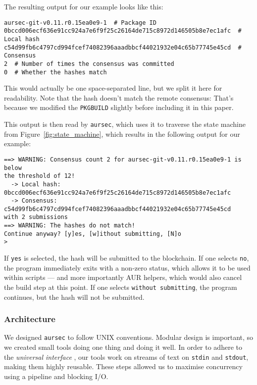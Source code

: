 The resulting output for our example looks like this:

\begin{verbatim}
aursec-git-v0.11.r0.15ea0e9-1  # Package ID
0bccd006ecf636e91cc924a7e6f9f25c26164de715c8972d146505b8e7ec1afc  # Local hash
c54d99fb6c4797cd994fcef74082396aaadbbcf44021932e04c65b77745e45cd  # Consensus
2  # Number of times the consensus was committed
0  # Whether the hashes match
\end{verbatim}

This would actually be one space-separated line, but we split it here for readability. Note that the hash doesn't match the remote consensus: That's because we modified the \texttt{PKGBUILD} slightly before including it in this paper.

This output is then read by \texttt{aursec}, which uses it to traverse the state machine from Figure~\ref{fig:state_machine}, which results in the following output for our example:

\begin{verbatim}
==> WARNING: Consensus count 2 for aursec-git-v0.11.r0.15ea0e9-1 is below
the threshold of 12!
  -> Local hash: 0bccd006ecf636e91cc924a7e6f9f25c26164de715c8972d146505b8e7ec1afc
  -> Consensus:  c54d99fb6c4797cd994fcef74082396aaadbbcf44021932e04c65b77745e45cd
with 2 submissions
==> WARNING: The hashes do not match!
Continue anyway? [y]es, [w]ithout submitting, [N]o
>
\end{verbatim}

If \texttt{yes} is selected, the hash will be submitted to the blockchain. If one selects \texttt{no}, the program immediately exits with a non-zero status, which allows it to be used within scripts --- and more importantly AUR helpers, which would also cancel the build step at this point.
If one selects \texttt{without submitting}, the program continues, but the hash will not be submitted.

\subsubsection{Architecture} \label{sec:aur-architecture}

We designed \texttt{aursec} to follow UNIX conventions.
Modular design is important, so we created small tools doing one thing and doing it well. In order to adhere to the \emph{universal interface} \cite{Salus:1994}, our tools work on streams of text on \texttt{stdin} and \texttt{stdout}, making them highly reusable. These steps allowed us to maximise concurrency using a pipeline and blocking I/O.


